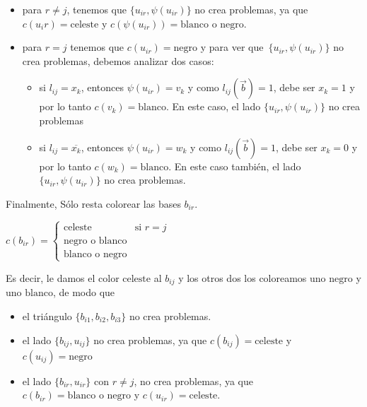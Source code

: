 \documentclass[10pt,a4paper]{article}
\begin{document}
\begin{itemize}

	\item para $r \neq j$, tenemos que $\{u_{ir},\psi(u_{ir})\}$ no crea problemas, ya que $c(u_ir) = \text{celeste}$ y $c(\psi(u_{ir})) = \text{blanco o negro}$.
	\item para $r= j$ tenemos que $c(u_{ir}) = \text{negro}$ y para ver que $\{u_{ir},\psi(u_{ir})\}$ no crea problemas, debemos analizar dos casos:
	\begin{itemize}

		\item si $l_{ij} = x_k$, entonces $\psi(u_{ir}) = v_k$ y como $l_{ij}(\overrightarrow{b}) = 1$, debe ser $x_k = 1$ y por lo tanto $c(v_k) = \text{blanco}$. En este caso, el lado $\{u_{ir},\psi(u_{ir})\}$ no crea problemas
		\item si $l_{ij} = \overline{x_k}$, entonces $\psi(u_{ir}) = w_k$ y como $l_{ij}(\overrightarrow{b}) = 1$, debe ser $x_k = 0$ y por lo tanto $c(w_k) = \text{blanco}$. En este caso también, el lado $\{u_{ir},\psi(u_{ir})\}$ no crea problemas.
	\end{itemize}
	
\end{itemize}

Finalmente, Sólo resta colorear las bases $b_{ir}$.

\begin{center}
$c(b_{ir}) = \begin{cases} \text{celeste} & \text{si } r = j\\ \text{negro o blanco}\\ \text{blanco o negro} \end{cases}$
\end{center}

Es decir, le damos el color $\text{celeste}$ al $b_{ij}$ y los otros dos los coloreamos uno $\text{negro}$ y uno $\text{blanco}$, de modo que

\begin{itemize}

	\item el triángulo $\{b_{i1}, b_{i2}, b_{i3}\}$ no crea problemas.
	\item el lado $\{b_{ij}, u_{ij}\}$ no crea problemas, ya que $c(b_{ij}) = \text{celeste}$ y $c(u_{ij}) = \text{negro}$
	\item el lado $\{b_{ir}, u_{ir}\}$ con $r \neq j$, no crea problemas, ya que $c(b_{ir}) = \text{blanco o negro}$ y $c(u_{ir}) = \text{celeste}$.
\end{itemize}
\end{document}
